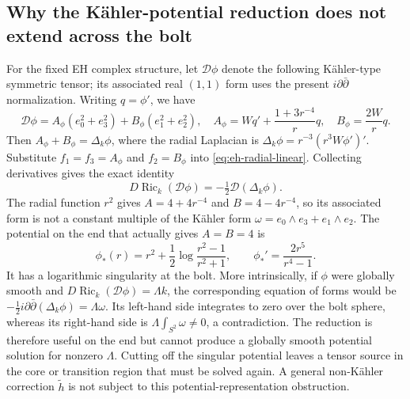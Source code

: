\documentclass[a4paper,11pt]{article}
\numberwithin{equation}{section}
\theoremstyle{definition}
\newcommand{\Ric}{\operatorname{Ric}}
\begin{document}
\subsection{Why the K\"ahler-potential reduction does not extend across the bolt}
For the fixed EH complex structure, let $\mathscr D\phi$ denote the following K\"ahler-type symmetric tensor;
its associated real $(1,1)$ form uses the present $i\partial\bar\partial$ normalization.
Writing $q=\phi'$, we have
\[
\mathscr D\phi=A_\phi(e_0^2+e_3^2)+B_\phi(e_1^2+e_2^2),\quad
A_\phi=Wq'+\frac{1+3r^{-4}}r q,\quad B_\phi=\frac{2W}r q.
\]
Then $A_\phi+B_\phi=\Delta_k\phi$, where the radial Laplacian is
$\Delta_k\phi=r^{-3}(r^3W\phi')'$.
Substitute $f_1=f_3=A_\phi$ and $f_2=B_\phi$ into \eqref{eq:eh-radial-linear}.
Collecting derivatives gives the exact identity
\begin{equation}\label{eq:eh-kahler-identity}
D\Ric_k(\mathscr D\phi)=-\tfrac12\mathscr D(\Delta_k\phi).
\end{equation}
The radial function $r^2$ gives $A=4+4r^{-4}$ and $B=4-4r^{-4}$, so its associated form is not a constant multiple of the K\"ahler form
$\omega=e_0\wedge e_3+e_1\wedge e_2$.
The potential on the end that actually gives $A=B=4$ is
\[
\phi_*(r)=r^2+\frac12\log\frac{r^2-1}{r^2+1},\qquad
\phi_*'=\frac{2r^5}{r^4-1}.
\]
It has a logarithmic singularity at the bolt. More intrinsically, if $\phi$ were globally smooth and
$D\Ric_k(\mathscr D\phi)=\Lambda k$, the corresponding equation of forms would be
$-\frac12i\partial\bar\partial(\Delta_k\phi)=\Lambda\omega$.
Its left-hand side integrates to zero over the bolt sphere, whereas its right-hand side is
$\Lambda\int_{S^2}\omega\ne0$, a contradiction.
The reduction is therefore useful on the end but cannot produce a globally smooth potential solution for nonzero $\Lambda$.
Cutting off the singular potential leaves a tensor source in the core or transition region that must be solved again.
A general non-K\"ahler correction $\widetilde h$ is not subject to this potential-representation obstruction.
\end{document}
